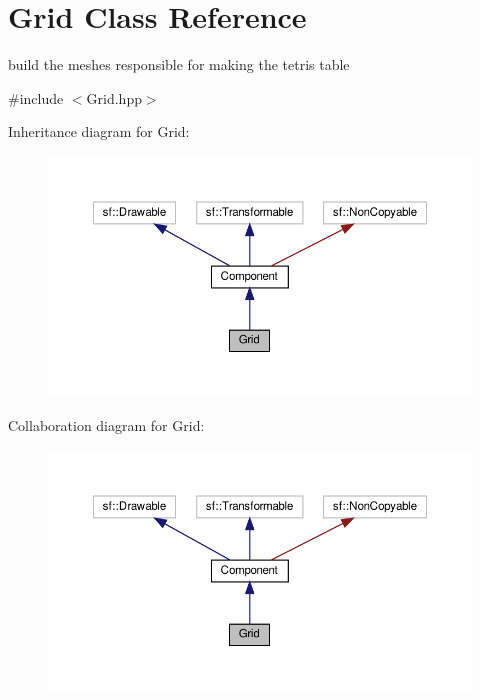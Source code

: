 \hypertarget{classGrid}{}\section{Grid Class Reference}
\label{classGrid}


build the meshes responsible for making the tetris table  




{\ttfamily \#include $<$Grid.\+hpp$>$}



Inheritance diagram for Grid\+:
\nopagebreak
\begin{figure}[H]
\begin{center}
\leavevmode
\includegraphics[width=350pt]{classGrid__inherit__graph}
\end{center}
\end{figure}


Collaboration diagram for Grid\+:
\nopagebreak
\begin{figure}[H]
\begin{center}
\leavevmode
\includegraphics[width=350pt]{classGrid__coll__graph}
\end{center}
\end{figure}
